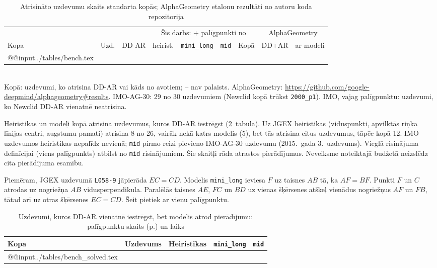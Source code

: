 \documentclass[nolabels]{../template/zpd}
\begin{document}
\begin{table}[H]
  \caption{Atrisināto uzdevumu skaits standarta kopās; AlphaGeometry etalonu rezultāti no autoru koda repozitorija}\label{tab:bench}
  \centering\small\setlength{\tabcolsep}{3.5pt}
  \begin{tabular}{@{}lcccccccc@{}}
    \toprule
    & & & \multicolumn{4}{c}{Šis darbs: + palīgpunkti no} & \multicolumn{2}{c}{AlphaGeometry} \\
    \cmidrule(lr){4-7}\cmidrule(l){8-9}
    Kopa & Uzd. & DD-AR & heirist. & \texttt{mini\_long} & \texttt{mid} & Kopā & DD+AR & ar modeli \\
    \midrule
    \csname @@input\endcsname ../tables/bench.tex 
    \bottomrule
  \end{tabular}\\[3pt]
  {\footnotesize Kopā: uzdevumi, ko atrisina DD-AR vai kāds no avotiem; -- nav palaists.
  AlphaGeometry: \url{https://github.com/google-deepmind/alphageometry#results}. IMO-AG-30: 29 no 30 uzdevumiem (Newclid kopā trūkst \texttt{2000\_p1}).
  IMO, vajag palīgpunktu: uzdevumi, ko Newclid DD-AR vienatnē neatrisina.}
\end{table}

Heiristikas un modeļi kopā atrisina \stuckSolved{} uzdevumus, kuros DD-AR iestrēgst
(\ref{tab:solved}~tabula). Uz JGEX heiristikas (viduspunkti, apvilktās riņķa līnijas centri,
augstumu pamati) atrisina 8 no 26, vairāk nekā katrs modelis (5), bet tās atrisina citus uzdevumus,
tāpēc kopā 12. IMO uzdevumos heiristikas nepalīdz nevienā; \texttt{mid} pirmo reizi pievieno IMO-AG-30
uzdevumu (2015.~gada 3.~uzdevums). Vieglā risinājuma
definīcijai (viens palīgpunkts) atbilst \midOneAux{} no \texttt{mid} risinājumiem. Šie skaitļi rāda atrastos pierādījumus. Neveiksme noteiktajā budžetā neizslēdz cita pierādījuma esamību.

Piemēram, JGEX uzdevumā \texttt{L058-9} jāpierāda $EC=CD$. Modelis \texttt{mini\_long} ieviesa $F$ uz taisnes $AB$ tā, ka $AF=BF$. Punkti $F$ un $C$ atrodas uz nogriežņa $AB$ vidusperpendikula. Paralēlās taisnes $AE$, $FC$ un $BD$ uz vienas šķērsenes atšķeļ vienādus nogriežņus $AF$ un $FB$, tātad arī uz otras šķērsenes $EC=CD$. Šeit pietiek ar vienu palīgpunktu.

\begin{table}[H]
  \caption{Uzdevumi, kuros DD-AR vienatnē iestrēgst, bet modelis atrod pierādījumu: palīgpunktu skaits (p.) un laiks}\label{tab:solved}
  \centering\footnotesize\setlength{\tabcolsep}{3.5pt}
  \begin{tabular}{@{}llccc@{}}
    \toprule
    Kopa & Uzdevums & Heiristikas & \texttt{mini\_long} & \texttt{mid} \\
    \midrule
    \csname @@input\endcsname ../tables/bench_solved.tex 
    \bottomrule
  \end{tabular}
\end{table}
\end{document}
